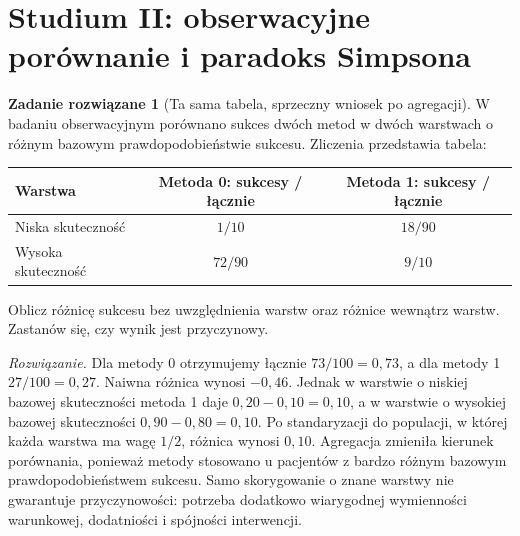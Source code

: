 \documentclass[11pt,a4paper,oneside]{report}
\numberwithin{equation}{chapter}
\theoremstyle{plain}
\theoremstyle{definition}
\newtheorem{zadanie}{Zadanie rozwiązane}[chapter]
\theoremstyle{remark}
\begin{document}
\section{Studium II: obserwacyjne porównanie i paradoks Simpsona}
\begin{zadanie}[Ta sama tabela, sprzeczny wniosek po agregacji]\label{ex:simpson-decision}
W badaniu obserwacyjnym porównano sukces dwóch metod w dwóch warstwach o różnym bazowym prawdopodobieństwie sukcesu. Zliczenia przedstawia tabela:
\begin{center}\small
\begin{tabular}{lcc}
\toprule
\textbf{Warstwa} & \textbf{Metoda 0: sukcesy / łącznie} & \textbf{Metoda 1: sukcesy / łącznie}\\
\midrule
Niska skuteczność & $1/10$ & $18/90$\\
Wysoka skuteczność & $72/90$ & $9/10$\\
\bottomrule
\end{tabular}
\end{center}
Oblicz różnicę sukcesu bez uwzględnienia warstw oraz różnice wewnątrz warstw. Zastanów się, czy wynik jest przyczynowy.\par
\emph{Rozwiązanie.} Dla metody 0 otrzymujemy łącznie $73/100=0{,}73$, a dla metody 1 $27/100=0{,}27$. Naiwna różnica wynosi $-0{,}46$. Jednak w warstwie o niskiej bazowej skuteczności metoda 1 daje $0{,}20-0{,}10=0{,}10$, a w warstwie o wysokiej bazowej skuteczności $0{,}90-0{,}80=0{,}10$. Po standaryzacji do populacji, w której każda warstwa ma wagę $1/2$, różnica wynosi $0{,}10$. Agregacja zmieniła kierunek porównania, ponieważ metody stosowano u pacjentów z bardzo różnym bazowym prawdopodobieństwem sukcesu. Samo skorygowanie o znane warstwy nie gwarantuje przyczynowości: potrzeba dodatkowo wiarygodnej wymienności warunkowej, dodatniości i spójności interwencji.
\end{zadanie}
\end{document}
